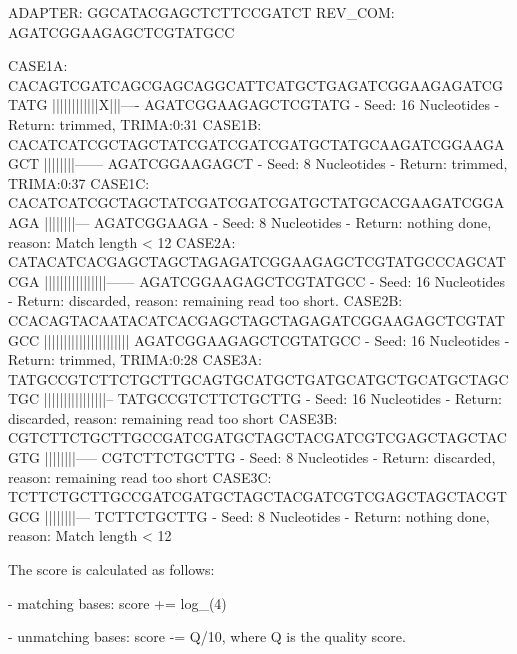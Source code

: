 \begin{DoxyCode}
ADAPTER: GGCATACGAGCTCTTCCGATCT
REV\_COM: AGATCGGAAGAGCTCGTATGCC

CASE1A:  CACAGTCGATCAGCGAGCAGGCATTCATGCTGAGATCGGAAGAGATCGTATG
                                         ||||||||||||X|||----
                                         AGATCGGAAGAGCTCGTATG
         - Seed: 16 Nucleotides
         - Return: trimmed, TRIMA:0:31
CASE1B:  CACATCATCGCTAGCTATCGATCGATCGATGCTATGCAAGATCGGAAGAGCT
                                               ||||||||------
                                               AGATCGGAAGAGCT
         - Seed: 8 Nucleotides
         - Return: trimmed, TRIMA:0:37
CASE1C:  CACATCATCGCTAGCTATCGATCGATCGATGCTATGCACGAAGATCGGAAGA
                                                  ||||||||---
                                                  AGATCGGAAGA
         - Seed: 8 Nucleotides
         - Return: nothing done, reason: Match length < 12
CASE2A:  CATACATCACGAGCTAGCTAGAGATCGGAAGAGCTCGTATGCCCAGCATCGA
                              ||||||||||||||||------
                              AGATCGGAAGAGCTCGTATGCC
         - Seed: 16 Nucleotides
         - Return: discarded, reason: remaining read too short.
CASE2B:  CCACAGTACAATACATCACGAGCTAGCTAGAGATCGGAAGAGCTCGTATGCC
                                       ||||||||||||||||||||||
                                       AGATCGGAAGAGCTCGTATGCC
         - Seed: 16 Nucleotides
         - Return: trimmed, TRIMA:0:28
CASE3A:  TATGCCGTCTTCTGCTTGCAGTGCATGCTGATGCATGCTGCATGCTAGCTGC
         ||||||||||||||||--
         TATGCCGTCTTCTGCTTG
         - Seed: 16 Nucleotides
         - Return: discarded, reason: remaining read too short
CASE3B:  CGTCTTCTGCTTGCCGATCGATGCTAGCTACGATCGTCGAGCTAGCTACGTG
         ||||||||-----
         CGTCTTCTGCTTG
         - Seed: 8 Nucleotides
         - Return: discarded, reason: remaining read too short
CASE3C:  TCTTCTGCTTGCCGATCGATGCTAGCTACGATCGTCGAGCTAGCTACGTGCG
         ||||||||---
         TCTTCTGCTTG
         - Seed: 8 Nucleotides
         - Return: nothing done, reason: Match length < 12
\end{DoxyCode}


The score is calculated as follows\+:
\begin{DoxyItemize}
\item -\/ matching bases\+: {\ttfamily score += log\+\_(4)}
\item -\/ unmatching bases\+: {\ttfamily score -\/= Q/10}, where Q is the quality score.
\end{DoxyItemize}

